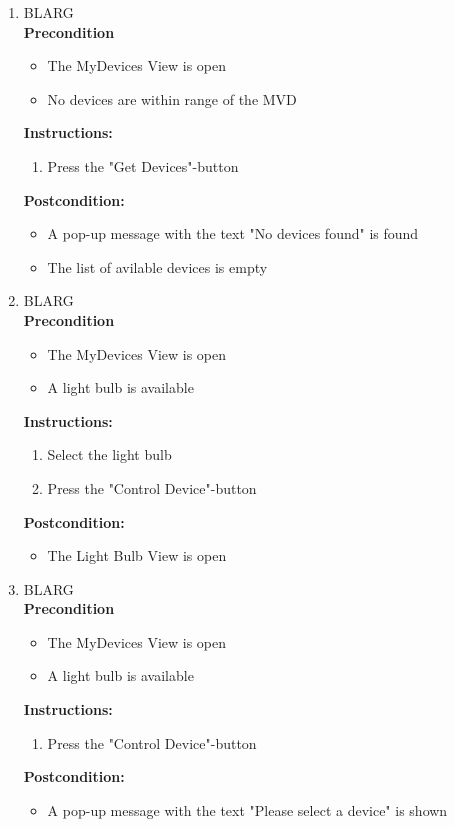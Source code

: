 \documentclass[a4paper]{article}
\newlength{\testlabellength}
\newenvironment{testlist}{\begin{enumerate}[label=\bfseries Instruction \thesubsection.\arabic* , labelindent=0pt, labelwidth=\testlabellength , leftmargin=2cm]}{\end{enumerate}}
\newenvironment{precondition}{
{\color{white}BLARG}\\ 
\textbf{Precondition}
\begin{itemize}[labelindent=0cm, labelwidth=2cm , leftmargin=1cm]
}
{\end{itemize}}
\newenvironment{instruction}{
\textbf{Instructions:}
\begin{enumerate}[label=\bfseries  \arabic*., labelindent=0cm, labelwidth=2cm , leftmargin=1cm]
}
{\end{enumerate}}
\newenvironment{postcondition}{
\textbf{Postcondition:}
\begin{itemize}[labelindent=0cm, labelwidth=2cm , leftmargin=1cm]
}
{\end{itemize}}
\begin{document}
\begin{appendices}
\begin{testlist}
	\item 
		\begin{precondition}
			\item The MyDevices View is open
			\item No devices are within range of the MVD
		\end{precondition}
		\begin{instruction}
			\item Press the "Get Devices"-button
		\end{instruction}
		\begin{postcondition}
			\item A pop-up message with the text "No devices found" is found
			\item The list of avilable devices is empty
		\end{postcondition}
	
	\item
		\begin{precondition}
			\item The MyDevices View is open
			\item A light bulb is available
		\end{precondition}
		\begin{instruction}
			\item Select the light bulb
			\item Press the "Control Device"-button
		\end{instruction}
		\begin{postcondition}
			\item The Light Bulb View is open
		\end{postcondition}

	\item
		\begin{precondition}
			\item The MyDevices View is open
			\item A light bulb is available
		\end{precondition}
		\begin{instruction}
			\item Press the "Control Device"-button
		\end{instruction}
		\begin{postcondition}
			\item A pop-up message with the text "Please select a device" is shown
		\end{postcondition}	


\end{testlist}
\end{appendices}
\end{document}
